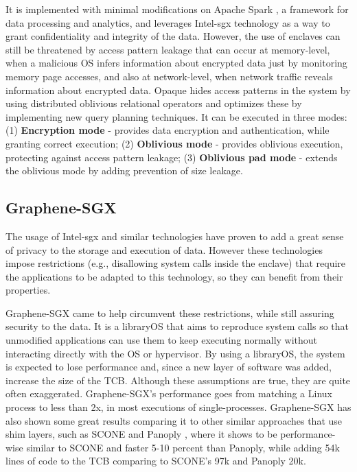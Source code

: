 It is implemented with minimal modifications on Apache Spark \cite{apacheSparkPaper}, a framework for data processing and analytics, and leverages Intel-\gls{sgx} technology as a way to grant confidentiality and integrity of the data. 
However, the use of enclaves can still be threatened by access pattern leakage that can occur at memory-level, when a malicious OS infers information about encrypted data just by monitoring memory page accesses, and also at network-level, when network traffic reveals information about encrypted data.
Opaque hides access patterns in the system by using distributed oblivious relational operators and optimizes these by implementing new query planning techniques. It can be executed in three modes: 
(1) \textbf{Encryption mode} - provides data encryption and authentication, while granting correct execution;
(2) \textbf{Oblivious mode} - provides oblivious execution, protecting against access pattern leakage;
(3) \textbf{Oblivious pad mode} - extends the oblivious mode by adding prevention of size leakage.


\subsection{Graphene-SGX}
\label{ssec:grapheneSGX}

The usage of Intel-\gls{sgx} and similar technologies have proven to add a great sense of privacy to the storage and execution of data. However these technologies impose restrictions (e.g., disallowing system calls inside the enclave) that require the applications to be  adapted to this technology, so they can benefit from their properties. 

Graphene-SGX \cite{graphenePaper} came to help circumvent these restrictions, while still assuring security to the data. It is a libraryOS that aims to reproduce system calls so that unmodified applications can use them to keep executing normally without interacting directly with the OS or hypervisor. 
By using a libraryOS, the system is expected to lose performance and, since a new layer of software was added, increase the size of the TCB. 
Although these assumptions are true, they are quite often exaggerated. Graphene-SGX's performance goes from matching a Linux process to less than 2x, in most executions of single-processes.
Graphene-SGX has also shown some great results comparing it to other similar approaches that use shim layers, such as SCONE \cite{sconePaper} and Panoply \cite{panoplyPaper}, where it shows to be performance-wise similar to SCONE and faster 5-10 percent than Panoply, while adding 54k lines of code to the TCB comparing to SCONE's 97k and Panoply 20k.

